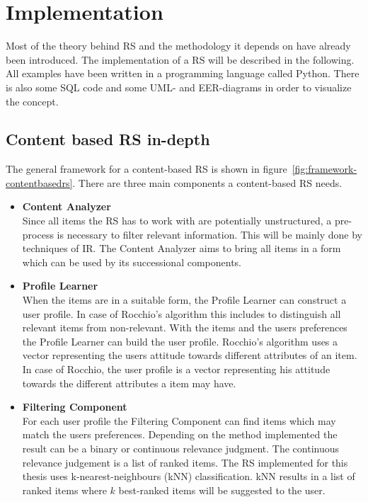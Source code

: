 

\section{Implementation}
Most of the theory behind RS and the methodology it depends on have already been introduced.
The implementation of a RS will be described in the following.
All examples have been written in a programming language called Python.
There is also some SQL code and some UML- and EER-diagrams in order to visualize the concept.

\subsection{Content based RS in-depth}
\label{sec:implementation-contentbased}
The general framework for a content-based RS is shown in figure~\ref{fig:framework-contentbasedrs}.
There are three main components a content-based RS needs.
\begin{itemize}
    \item \textbf{Content Analyzer}\hfill\\
        Since all items the RS has to work with are potentially unstructured, a pre-process is necessary to filter relevant information.
        This will be mainly done by techniques of IR.
        The Content Analyzer aims to bring all items in a form which can be used by its successional components.
        \citep[p.~75-77]{lops:2011}
    \item \textbf{Profile Learner}\hfill\\
        When the items are in a suitable form, the Profile Learner can construct a user profile.
        In case of Rocchio's algorithm this includes to distinguish all relevant items from non-relevant.
        With the items and the users preferences the Profile Learner can build the user profile.
        Rocchio's algorithm uses a vector representing the users attitude towards different attributes of an item.
        In case of Rocchio, the user profile is a vector representing his attitude towards the different attributes a item may have.
        \citep[p.~75-77]{lops:2011}
    \item \textbf{Filtering Component}\hfill\\
        For each user profile the Filtering Component can find items which may match the users preferences.
        Depending on the method implemented the result can be a binary or continuous relevance judgment.
        The continuous relevance judgement is a list of ranked items.
        \citep[p.~75-77]{lops:2011}
        The RS implemented for this thesis uses k-nearest-neighbours (kNN) classification.
        kNN results in a list of ranked items where $k$ best-ranked items will be suggested to the user.
\end{itemize}



